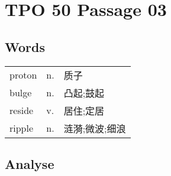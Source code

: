 \section{TPO 50 Passage 03}

\subsection{Words}

\begin{tabular}{lll}
    proton & n. & 质子       \\
    bulge  & n. & 凸起;鼓起    \\
    reside & v. & 居住;定居    \\
    ripple & n. & 涟漪;微波;细浪 \\
\end{tabular}

\subsection{Analyse}

